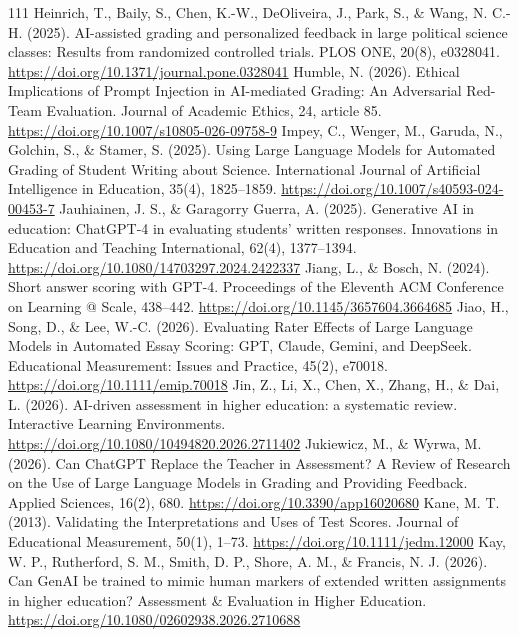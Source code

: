 \begin{thebibliography}{111}
 Heinrich, T., Baily, S., Chen, K.-W., DeOliveira, J., Park, S., \& Wang, N. C.-H. (2025). AI-assisted grading and personalized feedback in large political science classes: Results from randomized controlled trials. PLOS ONE, 20(8), e0328041. \url{https://doi.org/10.1371/journal.pone.0328041}
 Humble, N. (2026). Ethical Implications of Prompt Injection in AI-mediated Grading: An Adversarial Red-Team Evaluation. Journal of Academic Ethics, 24, article 85. \url{https://doi.org/10.1007/s10805-026-09758-9}
 Impey, C., Wenger, M., Garuda, N., Golchin, S., \& Stamer, S. (2025). Using Large Language Models for Automated Grading of Student Writing about Science. International Journal of Artificial Intelligence in Education, 35(4), 1825--1859. \url{https://doi.org/10.1007/s40593-024-00453-7}
 Jauhiainen, J. S., \& Garagorry Guerra, A. (2025). Generative AI in education: ChatGPT-4 in evaluating students' written responses. Innovations in Education and Teaching International, 62(4), 1377--1394. \url{https://doi.org/10.1080/14703297.2024.2422337}
 Jiang, L., \& Bosch, N. (2024). Short answer scoring with GPT-4. Proceedings of the Eleventh ACM Conference on Learning @ Scale, 438--442. \url{https://doi.org/10.1145/3657604.3664685}
 Jiao, H., Song, D., \& Lee, W.-C. (2026). Evaluating Rater Effects of Large Language Models in Automated Essay Scoring: GPT, Claude, Gemini, and DeepSeek. Educational Measurement: Issues and Practice, 45(2), e70018. \url{https://doi.org/10.1111/emip.70018}
 Jin, Z., Li, X., Chen, X., Zhang, H., \& Dai, L. (2026). AI-driven assessment in higher education: a systematic review. Interactive Learning Environments. \url{https://doi.org/10.1080/10494820.2026.2711402}
 Jukiewicz, M., \& Wyrwa, M. (2026). Can ChatGPT Replace the Teacher in Assessment? A Review of Research on the Use of Large Language Models in Grading and Providing Feedback. Applied Sciences, 16(2), 680. \url{https://doi.org/10.3390/app16020680}
 Kane, M. T. (2013). Validating the Interpretations and Uses of Test Scores. Journal of Educational Measurement, 50(1), 1--73. \url{https://doi.org/10.1111/jedm.12000}
 Kay, W. P., Rutherford, S. M., Smith, D. P., Shore, A. M., \& Francis, N. J. (2026). Can GenAI be trained to mimic human markers of extended written assignments in higher education? Assessment \& Evaluation in Higher Education. \url{https://doi.org/10.1080/02602938.2026.2710688}

\end{thebibliography}
